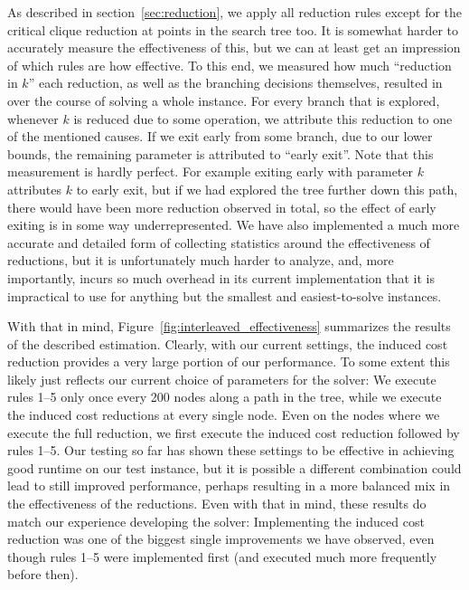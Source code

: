 \documentclass[12pt,oneside,english,parskip=full,headings=small]{scrbook}
\theoremstyle{definition}
\begin{document}
As described in section~\ref{sec:reduction}, we apply all reduction rules except for the critical
clique reduction at points in the search tree too. It is somewhat harder to accurately measure the
effectiveness of this, but we can at least get an impression of which rules are how effective. To
this end, we measured how much ``reduction in $k$'' each reduction, as well as the branching
decisions themselves, resulted in over the course of solving a whole instance. For every branch that
is explored, whenever $k$ is reduced due to some operation, we attribute this reduction to one of
the mentioned causes. If we exit early from some branch, due to our lower bounds, the remaining
parameter is attributed to ``early exit''. Note that this measurement is hardly perfect. For example
exiting early with parameter $k$ attributes $k$ to early exit, but if we had explored the tree
further down this path, there would have been more reduction observed in total, so the effect of
early exiting is in some way underrepresented. We have also implemented a much more accurate and
detailed form of collecting statistics around the effectiveness of reductions, but it is
unfortunately much harder to analyze, and, more importantly, incurs so much overhead in its current
implementation that it is impractical to use for anything but the smallest and easiest-to-solve
instances.

With that in mind, Figure~\ref{fig:interleaved_effectiveness} summarizes the results of the
described estimation. Clearly, with our current settings, the induced cost reduction provides a very
large portion of our performance. To some extent this likely just reflects our current choice of
parameters for the solver: We execute rules 1--5 only once every 200 nodes along a path in the tree,
while we execute the induced cost reductions at every single node. Even on the nodes where we
execute the full reduction, we first execute the induced cost reduction followed by rules 1--5. Our
testing so far has shown these settings to be effective in achieving good runtime on our test
instance, but it is possible a different combination could lead to still improved performance,
perhaps resulting in a more balanced mix in the effectiveness of the reductions. Even with that in
mind, these results do match our experience developing the solver: Implementing the induced cost
reduction was one of the biggest single improvements we have observed, even though rules 1--5 were
implemented first (and executed much more frequently before then).
\end{document}
